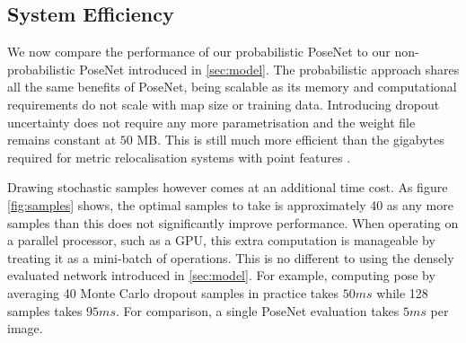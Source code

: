 \subsection{System Efficiency}

We now compare the performance of our probabilistic PoseNet to our non-probabilistic PoseNet introduced in \cref{sec:model}. The probabilistic approach shares all the same benefits of PoseNet, being scalable as its memory and computational requirements do not scale with map size or training data. Introducing dropout uncertainty does not require any more parametrisation and the weight file remains constant at $50$ MB. This is still much more efficient than the gigabytes required for metric relocalisation systems with point features \citep{li2012worldwide}.

Drawing stochastic samples however comes at an additional time cost. As figure \ref{fig:samples} shows, the optimal samples to take is approximately 40 as any more samples than this does not significantly improve performance. When operating on a parallel processor, such as a GPU, this extra computation is manageable by treating it as a mini-batch of operations. This is no different to using the densely evaluated network introduced in \cref{sec:model}. For example, computing pose by averaging 40 Monte Carlo dropout samples in practice takes $50ms$ while 128 samples takes $95ms$. For comparison, a single PoseNet evaluation takes $5ms$ per image.

